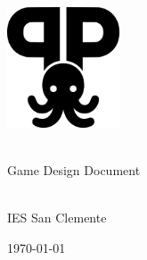 \begin{titlepage}
    \centering
    \vspace*{\fill} %

    \includegraphics[width=0.25\textwidth]{images/pulpasa_logo.png} \\[1cm]
    \vspace{2cm}

    {\Huge \textbf{\thetitle}} \\[1cm]
    {\large Game Design Document} \\[1.5cm]

    \vspace*{\fill}

    {\large \textbf{\theauthor}} \\ [1cm]
    {\large IES San Clemente} \\[4cm]

    \vspace*{\fill} %

    {\large \today}

    \restoregeometry %
\end{titlepage}

